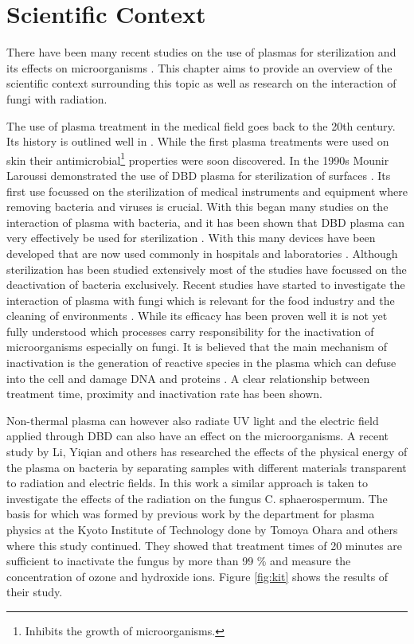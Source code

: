 \chapter{Scientific Context}
\label{chap:scientific_context}
There have been many recent studies on the use of plasmas for sterilization and its effects on microorganisms \cite{bacteria, app_study, kit, wound,inactivation}. This chapter aims to provide an overview of the scientific context surrounding this topic as well as research on the interaction of fungi with radiation.

The use of plasma treatment in the medical field goes back to the 20th century. Its history is outlined well in \cite{history}. While the first plasma treatments were used on skin their antimicrobial\footnote{Inhibits the growth of microorganisms.} properties were soon discovered. In the 1990s Mounir Laroussi demonstrated the use of DBD plasma for sterilization of surfaces \cite{laroussi}. Its first use focussed on the sterilization of medical instruments and equipment where removing bacteria and viruses is crucial. With this began many studies on the interaction of plasma with bacteria, and it has been shown that DBD plasma can very effectively be used for sterilization \cite{inactivation, app_study}. With this many devices have been developed that are now used commonly in hospitals and laboratories \cite{history}. Although sterilization has been studied extensively most of the studies have focussed on the deactivation of bacteria exclusively. Recent studies have started to investigate the interaction of plasma with fungi which is relevant for the food industry and the cleaning of environments  \cite{growth}. While its efficacy has been proven well it is not yet fully understood which processes carry responsibility for the inactivation of microorganisms especially on fungi. It is believed that the main mechanism of inactivation is the generation of reactive species in the plasma which can defuse into the cell and damage DNA and proteins \cite{app_study, inactivation}. A clear relationship between treatment time, proximity and inactivation rate has been shown. 

Non-thermal plasma can however also radiate UV light and the electric field applied through DBD can also have an effect on the microorganisms. A recent study by Li, Yiqian and others \cite{bacteria} has researched the effects of the physical energy of the plasma on bacteria by separating samples with different materials transparent to radiation and electric fields. In this work a similar approach is taken to investigate the effects of the radiation on the fungus C. sphaerospermum. The basis for which was formed by previous work by the department for plasma physics at the Kyoto Institute of Technology done by Tomoya Ohara and others \cite{kit} where this study continued. They showed that treatment times of 20 minutes are sufficient to inactivate the fungus by more than 99 \% and measure the concentration of ozone and hydroxide ions. Figure \ref{fig:kit} shows the results of their study. 

